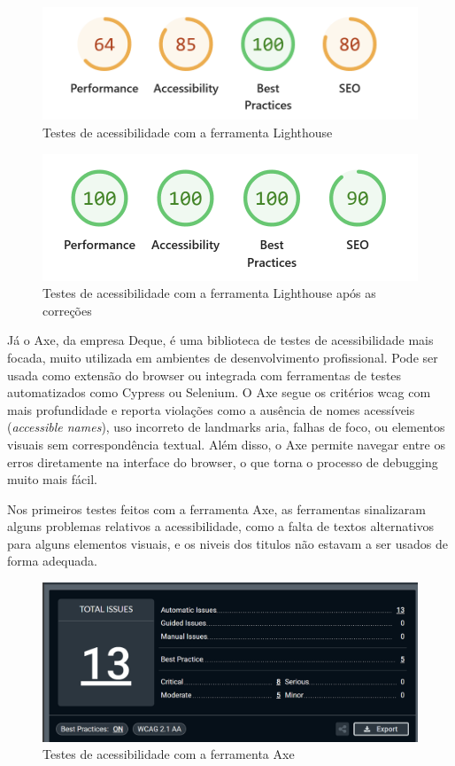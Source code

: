 \begin{figure}[H]
\centering
\includegraphics[width=\textwidth]{./img/lh_before}
\caption{Testes de acessibilidade com a ferramenta Lighthouse}
\end{figure}

\begin{figure}[H]
\centering
\includegraphics[width=\textwidth]{./img/lh_after}
\caption{Testes de acessibilidade com a ferramenta Lighthouse após as correções}
\end{figure}

Já o Axe, da empresa Deque, é uma biblioteca de testes de acessibilidade mais focada, muito utilizada em ambientes de desenvolvimento profissional. Pode ser usada como extensão do browser ou integrada com ferramentas de testes automatizados como Cypress ou Selenium. O Axe segue os critérios \gls{wcag} com mais profundidade e reporta violações como a ausência de nomes acessíveis (\textit{accessible names}), uso incorreto de landmarks \gls{aria}, falhas de foco, ou elementos visuais sem correspondência textual. Além disso, o Axe permite navegar entre os erros diretamente na interface do browser, o que torna o processo de debugging muito mais fácil.

Nos primeiros testes feitos com a ferramenta Axe, as ferramentas sinalizaram alguns problemas relativos a acessibilidade, como a falta de textos alternativos para alguns elementos visuais, e os niveis dos titulos não estavam a ser usados de forma adequada.

\begin{figure}[H]
    \centering
    \includegraphics[width=\textwidth]{./img/axe}
    \caption{Testes de acessibilidade com a ferramenta Axe}
    \end{figure}


